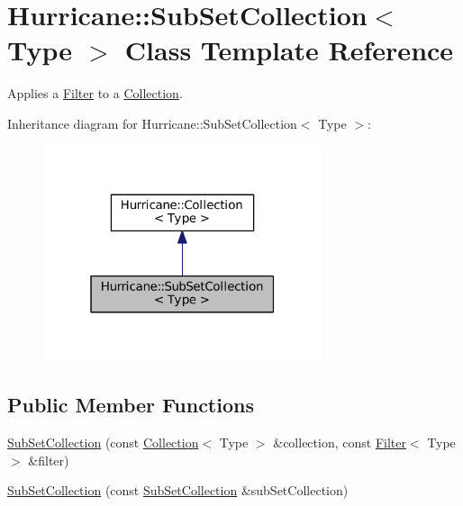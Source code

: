 \hypertarget{classHurricane_1_1SubSetCollection}{}\section{Hurricane\+:\+:Sub\+Set\+Collection$<$ Type $>$ Class Template Reference}
\label{classHurricane_1_1SubSetCollection}


Applies a \mbox{\hyperlink{classHurricane_1_1Filter}{Filter}} to a \mbox{\hyperlink{classHurricane_1_1Collection}{Collection}}.  




Inheritance diagram for Hurricane\+:\+:Sub\+Set\+Collection$<$ Type $>$\+:\nopagebreak
\begin{figure}[H]
\begin{center}
\leavevmode
\includegraphics[width=232pt]{classHurricane_1_1SubSetCollection__inherit__graph}
\end{center}
\end{figure}
\subsection*{Public Member Functions}
\begin{DoxyCompactItemize}
\item 
\mbox{\hyperlink{classHurricane_1_1SubSetCollection_a6da1f511e27351cdc8b56bda7fbc44e8}{Sub\+Set\+Collection}} (const \mbox{\hyperlink{classHurricane_1_1Collection}{Collection}}$<$ Type $>$ \&collection, const \mbox{\hyperlink{classHurricane_1_1Filter}{Filter}}$<$ Type $>$ \&filter)
\item 
\mbox{\hyperlink{classHurricane_1_1SubSetCollection_ad4e0bd9554d898f3991585758dbf2aac}{Sub\+Set\+Collection}} (const \mbox{\hyperlink{classHurricane_1_1SubSetCollection}{Sub\+Set\+Collection}} \&sub\+Set\+Collection)
\end{DoxyCompactItemize}


